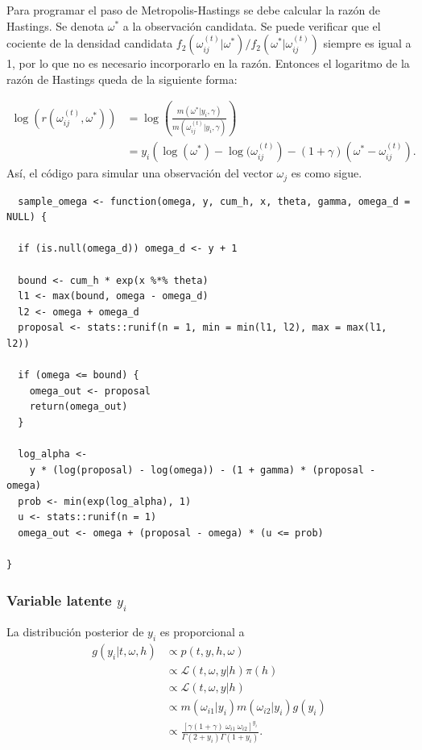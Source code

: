 \documentclass[11pt,a4paper]{article}
\begin{document}
Para programar el paso de Metropolis-Hastings se debe calcular la razón de Hastings. Se denota $\omega^*$ a la observación candidata. Se puede verificar que el cociente de la densidad candidata $f_2(\omega_{ij} ^{(t)} | \omega^*)/f_2(\omega^* | \omega_{ij} ^{(t)})$ siempre es igual a 1, por lo que no es necesario incorporarlo en la razón. Entonces el logaritmo de la razón de Hastings queda de la siguiente forma:

\begin{align*}
\log (r(\omega_{ij}^{(t)}, \omega^*)) &= \log \left(\frac{m(\omega^* | y_i, \gamma)}{m(\omega_{ij}^{(t)}| y_i, \gamma)}\right)\\
&= y_i \left(\log (\omega^*) - \log (\omega_{ij}^{(t)}\right) - (1 + \gamma)(\omega^* - \omega_{ij}^{(t)}).
\end{align*}
Así, el código para simular una observación del vector $\omega_j$ es como sigue.\\
\newpage

\begin{lstlisting}
  sample_omega <- function(omega, y, cum_h, x, theta, gamma, omega_d = NULL) {

  if (is.null(omega_d)) omega_d <- y + 1

  bound <- cum_h * exp(x %*% theta)
  l1 <- max(bound, omega - omega_d)
  l2 <- omega + omega_d
  proposal <- stats::runif(n = 1, min = min(l1, l2), max = max(l1, l2))

  if (omega <= bound) {
    omega_out <- proposal
    return(omega_out)
  }

  log_alpha <-
    y * (log(proposal) - log(omega)) - (1 + gamma) * (proposal - omega)
  prob <- min(exp(log_alpha), 1)
  u <- stats::runif(n = 1)
  omega_out <- omega + (proposal - omega) * (u <= prob)

}
\end{lstlisting}\leavevmode\newline


\subsubsection*{Variable latente $y_i$}
\label{posterior_y}

La distribución posterior de $y_i$ es proporcional a
\begin{align*}
g(y_i | t, \omega, h) &\propto p(t, y, h, \omega)\\
&\propto \mathcal{L}(t, \omega, y |h) \pi(h)\\
&\propto \mathcal{L}(t, \omega, y |h)\\
&\propto m(\omega_{i1}|y_i)m(\omega_{i2}|y_i)g(y_i)\\
&\propto \frac{\left[\gamma (1+\gamma) \ \omega_{i1} \ \omega_{i2}\right]^{y_i}}{\Gamma(2+y_i)\Gamma(1+y_i)}.
\end{align*}
\end{document}
